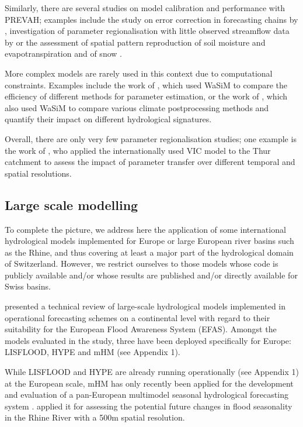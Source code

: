 \documentclass[10pt,a4paper]{article}
\begin{document}
Similarly, there are several studies on model calibration and performance with PREVAH; examples include the study on error correction in forecasting chains by \citet{Bogner_2018}, investigation of parameter regionalisation with little observed streamflow data by \citet{Viviroli2015} or the assessment of spatial pattern reproduction of soil moisture and evapotranspiration \citep{Zappa2003} and of snow \citep{Zappa2008a}.

More complex models are rarely used in this context due to computational constraints. Examples include the work of \citet{Cullmann2011}, which used WaSiM to compare the efficiency of different methods for parameter estimation, or the work of \citet{Rossler2019}, which also used WaSiM to compare various climate postprocessing methods and quantify their impact on different hydrological signatures. 

Overall, there are only very few parameter regionalisation studies; one example is the work of \citet{Melsen2016}, who applied the internationally used VIC model to the Thur catchment to assess the impact of parameter transfer over different temporal and spatial resolutions.

\subsection{Large scale modelling}
\label{sec:application:largescale}

To complete the picture, we address here the application of some international hydrological models implemented for Europe or large European river basins such as the Rhine, and thus covering at least a major part of the hydrological domain of Switzerland. However, we restrict ourselves to those models whose code is publicly available and/or whose results are published and/or directly available for Swiss basins. 

\citet{Kauffeldt_2016} presented a technical review of large-scale hydrological models implemented in operational forecasting schemes on a continental level with regard to their suitability for the European Flood Awareness System (EFAS). Amongst the models evaluated in the study, three have been deployed specifically for Europe: LISFLOOD, HYPE and mHM (see Appendix 1).

While LISFLOOD and HYPE are already running operationally (see Appendix 1) at the European scale, mHM has only recently been applied for the development and evaluation of a pan-European multimodel seasonal hydrological forecasting system \citep{Wanders_2019}. \citet{Rottler2020} applied it for assessing the potential future changes in flood seasonality in the Rhine River with a 500m spatial resolution. 
\end{document}
